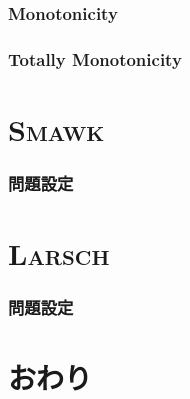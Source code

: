 \documentclass[
  lualatex,
  ja=standard,
  compress,
  hyperref={colorlinks, urlcolor=magenta, linkcolor=blue!55!black},
  dvipsnames,
  svgnames,
]{beamer}
\begin{document}
\begin{frame}
  \frametitle{Monotonicity}
\end{frame}

\begin{frame}
  \frametitle{Totally Monotonicity}
\end{frame}

\section{\textsc{Smawk}}
\begin{frame}
  \frametitle{問題設定}
\end{frame}

\section{\textsc{Larsch}}
\begin{frame}
  \frametitle{問題設定}
\end{frame}

\section{おわり}
\begin{frame}
  \vspace{3em}

  \Thankyou
\end{frame}
\end{document}
